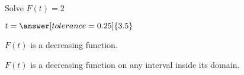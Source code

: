 \documentclass{ximera}
\begin{document}
\begin{exercise}
\begin{question}
Solve $F(t) = 2$

$t = \answer[tolerance=0.25]{3.5}  $

\end{question}











\begin{question} 



$F(t)$ is a decreasing function.
\begin{multipleChoice}
\end{multipleChoice}

\end{question}






\begin{question} 



$F(t)$ is a decreasing function on any interval inside its domain.
\begin{multipleChoice}
\end{multipleChoice}

\end{question}









\end{exercise}
\end{document}
